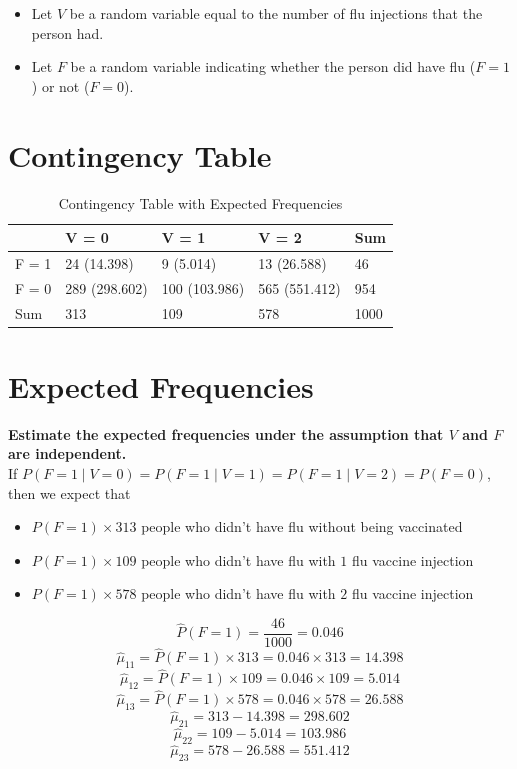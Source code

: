\documentclass[
]{book}
\providecommand{\tightlist}{%
  \setlength{\itemsep}{0pt}\setlength{\parskip}{0pt}}
\begin{document}
\begin{itemize}
\tightlist
\item
  Let \(V\) be a random variable equal to the number of flu injections that the person had.
\item
  Let \(F\) be a random variable indicating whether the person did have flu (\(F = 1\)) or not (\(F = 0\)).
\end{itemize}

\section{Contingency Table}\label{contingency-table}

\begin{table}

\caption{\label{tab:unnamed-chunk-7}Contingency Table with Expected Frequencies}
\centering
\begin{tabular}[t]{l|l|l|l|l}
\hline
  & V = 0 & V = 1 & V = 2 & Sum\\
\hline
F = 1 & 24 (14.398) & 9 (5.014) & 13 (26.588) & 46\\
\hline
F = 0 & 289 (298.602) & 100 (103.986) & 565 (551.412) & 954\\
\hline
Sum & 313 & 109 & 578 & 1000\\
\hline
\end{tabular}
\end{table}

\section{Expected Frequencies}\label{expected-frequencies}

\textbf{Estimate the expected frequencies under the assumption that \(V\) and \(F\) are independent.}\\
If \(P(F = 1 \mid V = 0) = P(F = 1 \mid V = 1) = P(F = 1 \mid V = 2) = P(F = 0)\), then we expect that

\begin{itemize}
\tightlist
\item
  \(P(F = 1) \times 313\) people who didn't have flu without being vaccinated
\item
  \(P(F = 1) \times 109\) people who didn't have flu with \(1\) flu vaccine injection
\item
  \(P(F = 1) \times 578\) people who didn't have flu with \(2\) flu vaccine injection
\end{itemize}

\[\hat{P}(F = 1) = \frac{46}{1000} = 0.046\]
\[\hat{\mu}_{11} = \hat{P}(F = 1) \times 313 = 0.046 \times 313 = 14.398\]
\[\hat{\mu}_{12} = \hat{P}(F = 1) \times 109 = 0.046 \times 109 = 5.014\]
\[\hat{\mu}_{13} = \hat{P}(F = 1) \times 578 = 0.046 \times 578 = 26.588\]
\[\hat{\mu}_{21} = 313 - 14.398 = 298.602\]
\[\hat{\mu}_{22} = 109 - 5.014 = 103.986\]
\[\hat{\mu}_{23} = 578 - 26.588 = 551.412\]
\end{document}
